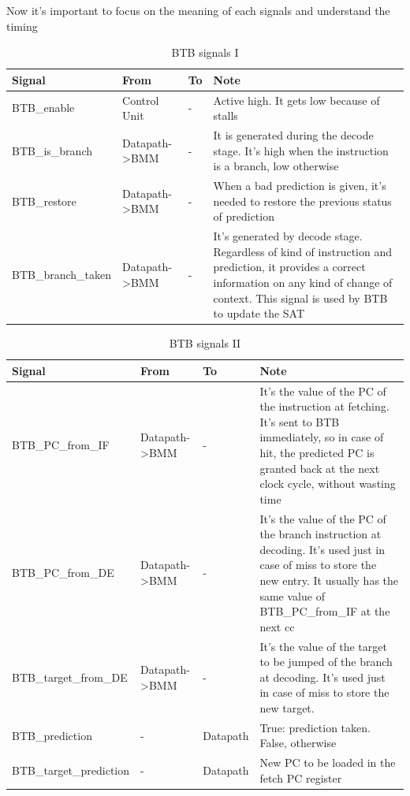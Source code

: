 Now it's important to focus on the meaning of each signals and understand the timing
\begin{table}[H]
\centering
\begin{tabular}{|p{}|p{}|p{}|p{}|}
\hline
\textbf{Signal}&\textbf{From}&\textbf{To}&\textbf{Note}\\ \hline
BTB\_enable & Control Unit & - & Active high. It gets low because of stalls\\ \hline
BTB\_is\_branch & Datapath->BMM & - & It is generated during the decode stage. It's high when the instruction is a branch, low otherwise\\ \hline
BTB\_restore & Datapath->BMM & - & When a bad prediction is given, it's needed to restore the previous status of prediction\\ \hline
BTB\_branch\_taken & Datapath->BMM & - & It's generated by decode stage. Regardless of kind of instruction and prediction, it provides a correct information on any kind of change of context. This signal is used by BTB to update the SAT\\ \hline
\end{tabular}
\caption{BTB signals I}
\end{table}
\begin{table}[H]
\centering
\begin{tabular}{|p{}|p{}|p{}|p{}|}
\hline
\textbf{Signal}&\textbf{From}&\textbf{To}&\textbf{Note}\\ \hline
BTB\_PC\_from\_IF & Datapath->BMM & - & It's the value of the PC of the instruction at fetching. It's sent to BTB immediately, so in case of hit, the predicted PC is granted back at the next clock cycle, without wasting time\\ \hline
BTB\_PC\_from\_DE & Datapath->BMM & - & It's the value of the PC of the branch instruction at decoding. It's used just in case of miss to store the new entry. It usually has the same value of BTB\_PC\_from\_IF at the next cc\\ \hline
BTB\_target\_from\_DE & Datapath->BMM & - & It's the value of the target to be jumped of the branch at decoding. It's used just in case of miss to store the new target. \\ \hline
BTB\_prediction & - & Datapath & True: prediction taken. False, otherwise \\ \hline
BTB\_target\_prediction & - & Datapath & New PC to be loaded in the fetch PC register \\ \hline
\end{tabular}
\caption{BTB signals II}
\end{table}

